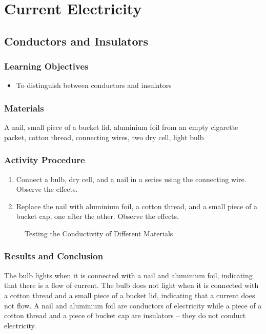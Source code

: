 \section{Current Electricity}

\subsection{Conductors and Insulators}

\subsubsection*{Learning Objectives}
\begin{itemize}
\item{To distinguish between conductors and insulators} 
\end{itemize}

\subsubsection*{Materials}
A nail, small piece of a bucket lid, aluminium foil from an empty cigarette packet, cotton thread, connecting wires, two dry cell, light bulb


\subsubsection*{Activity Procedure}
\begin{enumerate}
\item{Connect a bulb, dry cell, and a nail in a series using the connecting wire. Observe the effects.} 
\item{Replace the nail with aluminium foil, a cotton thread, and a small piece of a bucket cap, one after the other. Observe the effects.} 
\end{enumerate}

\begin{figure}
\begin{center}
\def\svgwidth{150pt}

\caption{Testing the Conductivity of Different Materials}
\label{fig:conductors-insulators}
\end{center}
\end{figure}

\subsubsection*{Results and Conclusion}
The bulb lights when it is connected with a nail and aluminium foil, indicating that there is a flow of current. The bulb does not light when it is connected with a cotton thread and a small piece of a bucket lid, indicating that a current does not flow. A nail and aluminium foil are conductors of electricity while a piece of a cotton thread and a piece of bucket cap are insulators -- they do not conduct electricity.

